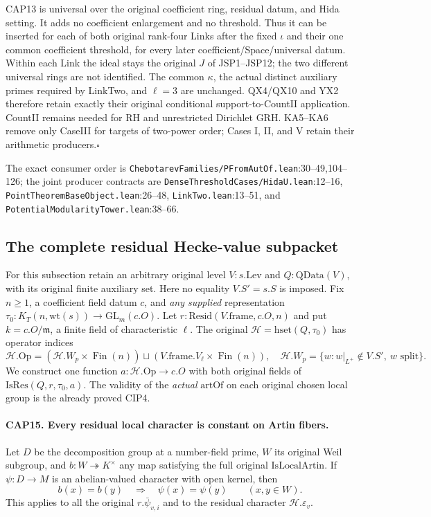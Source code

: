 CAP13 is universal over the original coefficient ring, residual datum,
and Hida setting.  It adds no coefficient enlargement and no threshold.
Thus it can be inserted for each of both original rank-four Links
after the fixed $\iota$ and their one common coefficient threshold,
for every later coefficient/Space/universal datum.  Within each Link
the ideal stays the original $J$ of JSP1--JSP12; the two different
universal rings are not identified.  The common $\kappa$, the actual
distinct auxiliary primes required by LinkTwo, and $\ell=3$ are
unchanged.  QX4/QX10 and YX2 therefore retain exactly their original
conditional support-to-CountII application.  CountII remains needed
for RH and unrestricted Dirichlet GRH.  KA5--KA6 remove only CaseIII
for targets of two-power order; Cases I, II, and V retain their
arithmetic producers.\hfill$\square$

The exact consumer order is
\nolinkurl{ChebotarevFamilies/PFromAutOf.lean}:30--49,104--126;
the joint producer contracts are
\nolinkurl{DenseThresholdCases/HidaU.lean}:12--16,
\nolinkurl{PointTheoremBaseObject.lean}:26--48,
\nolinkurl{LinkTwo.lean}:13--51, and
\nolinkurl{PotentialModularityTower.lean}:38--66.

\subsection{The complete residual Hecke-value subpacket}

For this subsection retain an arbitrary original level $V:s.\mathrm{Lev}$
and $Q:\mathrm{QData}(V)$, with its original finite auxiliary set.
Here no equality $V.S'=s.S$ is imposed.  Fix $n\geq1$, a coefficient
field datum $c$, and \emph{any supplied} representation
$\tau_0:K_T(n,\mathrm{wt}(s))\to\mathrm{GL}_m(c.O)$.
Let $r:\mathrm{Resid}(V.\mathrm{frame},c.O,n)$ and put
$k=c.O/\mathfrak m$, a finite field of characteristic $\ell$.
The original $\mathcal H=\mathrm{hset}(Q,\tau_0)$ has operator indices
\[
 \mathcal H.\mathrm{Op}
   =(\mathcal H.W_p\times\operatorname{Fin}(n))
      \sqcup(V.\mathrm{frame}.V_\ell\times\operatorname{Fin}(n)),
 \quad
 \mathcal H.W_p=
 \{w:w|_{L^+}\notin V.S',\ w\text{ split}\}.
 \tag{CAP.20}
\]
We construct one function $a:\mathcal H.\mathrm{Op}\to c.O$ with
both original fields of $\mathrm{IsRes}(Q,r,\tau_0,a)$.
The validity of the \emph{actual} $\mathrm{artOf}$ on each original
chosen local group is the already proved CIP4.

\paragraph{CAP15. Every residual local character is constant on Artin fibers.}
\label{claim:CAP15}
Let $D$ be the decomposition group at a number-field prime, $W$ its
original Weil subgroup, and $b:W\twoheadrightarrow K^\times$ any map
satisfying the full original $\mathrm{IsLocalArtin}$.  If
$\psi:D\to M$ is an abelian-valued character with open kernel, then
\[
 b(x)=b(y)\quad\Longrightarrow\quad\psi(x)=\psi(y)
 \qquad(x,y\in W).
 \tag{CAP.21}
\]
This applies to all the original $r.\bar\psi_{v,i}$ and to the
residual character $\mathcal H.\varepsilon_v$.

